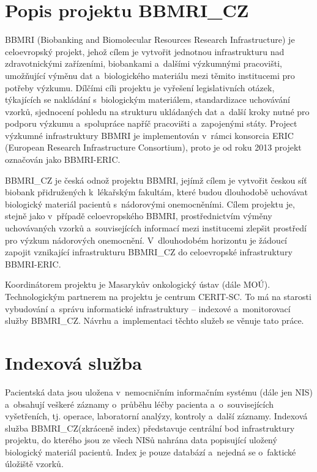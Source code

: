 \documentclass[11pt, final, oneside]{fithesis2}
\newcommand{\ProjectName}{\mbox{BBMRI\_CZ}\xspace}
\begin{document}
\section{Popis projektu \ProjectName}\label{chapter:analysis:section:projectDescription}
BBMRI (Biobanking and Biomolecular Resources Research Infrastructure) je celoevropský projekt, jehož cílem je vytvořit jednotnou infrastrukturu nad zdravotnickými zařízeními, biobankami a~dalšími výzkumnými pracovišti, umožňující výměnu dat a~biologického materiálu mezi těmito institucemi pro potřeby výzkumu. Dílčími cíli projektu je vyřešení legislativních otázek, týkajících se nakládání s~biologickým materiálem, standardizace uchovávání vzorků, sjednocení pohledu na strukturu ukládaných dat a~další kroky nutné pro podporu výzkumu a~spolupráce napříč pracovišti a~zapojenými státy. Project výzkumné infrastruktury BBMRI je implementován v~rámci konsorcia ERIC (European Research Infrastructure Consortium), proto je od roku 2013 projekt označován jako BBMRI-ERIC.

\ProjectName je česká odnož projektu BBMRI, jejímž cílem je vytvořit českou síť biobank přidružených k~lékařským fakultám, které budou dlouhodobě uchovávat biologický materiál pacientů s~nádorovými onemocněními. Cílem projektu je, stejně jako v~případě celoevropského BBMRI, prostřednictvím výměny uchovávaných vzorků a~souvisejících informací mezi institucemi zlepšit prostředí pro výzkum nádorových onemocnění. V~dlouhodobém horizontu je žádoucí zapojit vznikající infrastrukturu \ProjectName do celoevropské infrastruktury BBMRI-ERIC. 

Koordinátorem projektu je Masarykův onkologický ústav (dále MOÚ). Technologickým partnerem na projektu je centrum CERIT-SC. To má na starosti vybudování a~správu informatické infrastruktury – indexové a~monitorovací služby \ProjectName. Návrhu a~implementaci těchto služeb se věnuje tato práce.

\section{Indexová služba}\label{chapter:analysis:section:index}
Pacientská data jsou uložena v~nemocničním informačním systému (dále jen NIS) a~obsahují veškeré záznamy o~průběhu léčby pacienta a~o~souvisejících vyšetřeních, tj. operace, laboratorní analýzy, kontroly a~další záznamy. Indexová služba \ProjectName (zkráceně index) představuje centrální bod infrastruktury projektu, do kterého jsou ze všech NISů nahrána data popisující uložený biologický materiál pacientů. Index je pouze databází a~nejedná se o~faktické úložiště vzorků.
\end{document}
